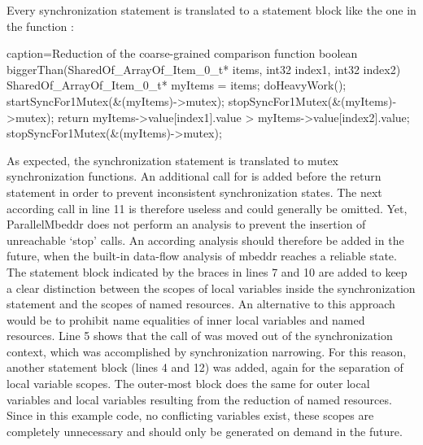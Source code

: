 Every synchronization statement is translated to a statement block like the one in the function :\newpage
\begin{ccode}{caption=Reduction of the coarse-grained comparison function}
boolean biggerThan(SharedOf_ArrayOf_Item_0_t* items, int32 index1, int32 index2) {
  { 
    SharedOf_ArrayOf_Item_0_t* myItems = items; 
    { 
      doHeavyWork(); 
      startSyncFor1Mutex(&(myItems)->mutex); 
      { 
        stopSyncFor1Mutex(&(myItems)->mutex); 
        return myItems->value[index1].value > myItems->value[index2].value; 
      } 
      stopSyncFor1Mutex(&(myItems)->mutex); 
    } 
  }
}
\end{ccode}
As expected, the synchronization statement is translated to mutex synchronization functions. An additional call for  is added before the return statement in order to prevent inconsistent synchronization states. The next according call in line 11 is therefore useless and could generally be omitted. Yet, ParallelMbeddr does not perform an analysis to prevent the insertion of unreachable `stop' calls. An according analysis should therefore be added in the future, when the built-in data-flow analysis of mbeddr reaches a reliable state. The statement block indicated by the braces in lines 7 and 10 are added to keep a clear distinction between the scopes of local variables inside the synchronization statement and the scopes of named resources. An alternative to this approach would be to prohibit name equalities of inner local variables and named resources. Line 5 shows that the call of  was moved out of the synchronization context, which was accomplished by synchronization narrowing. For this reason, another statement block (lines 4 and 12) was added, again for the separation of local variable scopes. The outer-most block does the same for outer local variables and local variables resulting from the reduction of named resources. Since in this example code, no conflicting variables exist, these scopes are completely unnecessary and should only be generated on demand in the future.

